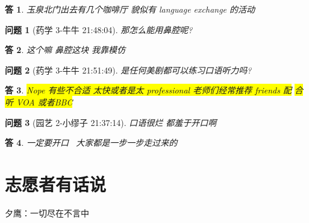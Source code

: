 \documentclass[utf8,a4paper]{ctexart}
\theoremstyle{nonumberplain}
\newtheorem{answer}{\color{blue}答}
\theoremstyle{nonumberplain}
\newtheorem{question}{\color{magenta}问题}
\newcommand\tips[1]{\colorbox{yellow}{#1}}
\begin{document}
\begin{answer}
  玉泉北门出去有几个咖啡厅 貌似有 language exchange 的活动
\end{answer}

\begin{question}[药学 3-牛牛 21:48:04]
  那怎么能用鼻腔呢?
\end{question}

\begin{answer}
  这个嘛 鼻腔这块 我靠模仿
\end{answer}

\begin{question}[药学 3-牛牛 21:51:49]
  是任何美剧都可以练习口语听力吗?
\end{question}
\begin{answer}
  \tips{Nope 有些不合适 太快或者是太 professional 老师们经常推荐 friends 配}
\tips{合听 VOA 或者BBC}
\end{answer}

\begin{question}[园艺 2-小缪子 21:37:14]
  口语很烂 都羞于开口啊
\end{question}
\begin{answer}
  一定要开口 ~大家都是一步一步走过来的~
\end{answer}

\section{志愿者有话说}
夕鹰：一切尽在不言中
\end{document}
